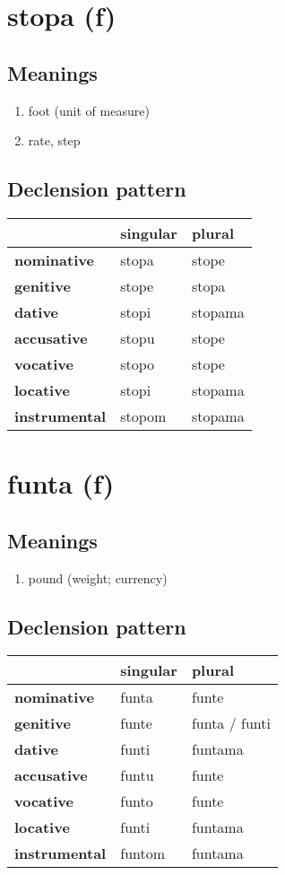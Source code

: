 \filbreak
\section{stopa (f)}
\subsection*{Meanings}
\begin{enumerate}
\item foot (unit of measure)
\item rate, step
\end{enumerate}
\subsection*{Declension pattern}
\begin{tabularx}{\linewidth}{Xll}
\toprule
{} & singular &   plural \\
\midrule
\textbf{nominative  } &    stopa &    stope \\
\textbf{genitive    } &    stope &    stopa \\
\textbf{dative      } &    stopi &  stopama \\
\textbf{accusative  } &    stopu &    stope \\
\textbf{vocative    } &    stopo &    stope \\
\textbf{locative    } &    stopi &  stopama \\
\textbf{instrumental} &   stopom &  stopama \\
\bottomrule
\end{tabularx}

\filbreak
\section{funta (f)}
\subsection*{Meanings}
\begin{enumerate}
\item pound (weight; currency)
\end{enumerate}
\subsection*{Declension pattern}
\begin{tabularx}{\linewidth}{Xll}
\toprule
{} & singular &         plural \\
\midrule
\textbf{nominative  } &    funta &          funte \\
\textbf{genitive    } &    funte &  funta / funti \\
\textbf{dative      } &    funti &        funtama \\
\textbf{accusative  } &    funtu &          funte \\
\textbf{vocative    } &    funto &          funte \\
\textbf{locative    } &    funti &        funtama \\
\textbf{instrumental} &   funtom &        funtama \\
\bottomrule
\end{tabularx}

